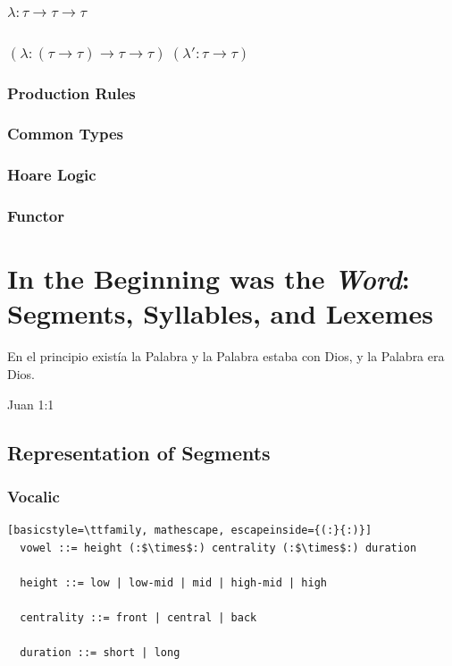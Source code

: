 \documentclass{report}[12pt]
\begin{document}
\subsection*{$\lambda : \tau \rightarrow \tau \rightarrow \tau$}

\subsection*{$(\lambda : (\tau \rightarrow \tau) \rightarrow \tau \rightarrow \tau)\ (\lambda' : \tau \rightarrow \tau)$}

\subsection*{Production Rules}

\subsection*{Common Types}

\subsection*{Hoare Logic}

\subsection*{Functor}

\chapter{In the Beginning was the \emph{Word}: \\ Segments, Syllables, and Lexemes}

\epigraph{En el principio existía la Palabra y la Palabra estaba con Dios, y la Palabra era Dios.}{Juan 1:1}

\section{Representation of Segments}

\subsection{Vocalic}

\begin{lstlisting}[basicstyle=\ttfamily, mathescape, escapeinside={(:}{:)}]
  vowel ::= height (:$\times$:) centrality (:$\times$:) duration

  height ::= low | low-mid | mid | high-mid | high

  centrality ::= front | central | back

  duration ::= short | long
\end{lstlisting}
\end{document}
